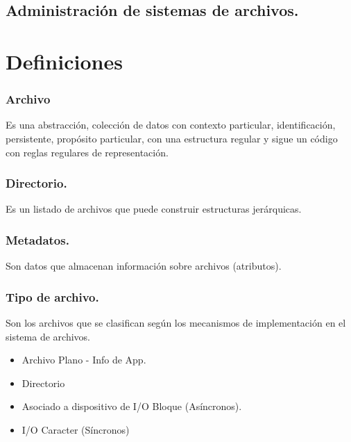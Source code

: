 \chapter{Administraci\'{o}n de sistemas de archivos.}
\part{Definiciones}
\section{Archivo}
Es una abstracci\'{o}n, colecci\'{o}n de datos con contexto particular, identificaci\'{o}n, persistente, prop\'{o}sito particular, con una estructura regular y sigue un c\'{o}digo con reglas regulares de representaci\'{o}n.\\

\section{Directorio.}
Es un listado de archivos que puede construir estructuras jer\'{a}rquicas.\\

\section{Metadatos.}
Son datos que almacenan informaci\'{o}n sobre archivos (atributos).\\

\section{Tipo de archivo.}
Son los archivos que se clasifican seg\'{u}n los mecanismos de implementaci\'{o}n en el sistema de archivos.\\
\begin{itemize}
	\item Archivo Plano - Info de App.
	\item Directorio
	\item Asociado a dispositivo de I/O Bloque (As\'{i}ncronos).
	\item I/O Caracter (S\'{i}ncronos)
\end{itemize}

